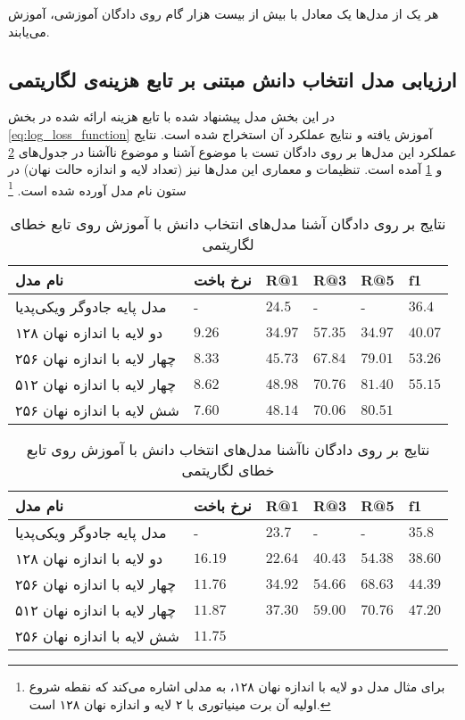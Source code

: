 هر یک از مدل‌ها یک 
معادل با بیش از بیست هزار گام روی دادگان آموزشی، آموزش می‌یابند.

\subsection{ارزیابی مدل انتخاب دانش مبتنی بر تابع هزینه‌ی لگاریتمی }
در این بخش مدل‌ پیشنهاد شده با تابع هزینه ارائه شده در بخش 
\ref{eq:log_loss_function}
آموزش یافته و نتایج عملکرد آن استخراج شده است. نتایج عملکرد این مدل‌ها بر روی دادگان تست با موضوع آشنا و موضوع ناآشنا در جدول‌های 
\ref{table:knowledge:log:unseen}
و 
\ref{table:knowledge:log:seen}
آمده است. تنظیمات و معماری این مدل‌ها نیز (تعداد لایه و اندازه حالت نهان) در ستون نام مدل آورده شده است.
\footnote{برای مثال مدل دو لایه با اندازه نهان ۱۲۸، به مدلی اشاره می‌کند که نقطه شروع اولیه آن برت مینیاتوری با ۲ لایه و اندازه نهان ۱۲۸ است.}

\begin{table}[h]
	\caption{نتایج بر روی دادگان آشنا مدل‌های انتخاب دانش با آموزش روی تابع خطای لگاریتمی }
	\centering
	\label{table:knowledge:log:seen}
	\begin{tabular}{|l|l|l|l|l|l|}
		\hline
		نام مدل                      & نرخ باخت & R@1     & R@3     & R@5     & f1      \\ \hline
		مدل پایه جادوگر ویکی‌پدیا    & -        & $24.5$  & -       & -       & $36.4$  \\ \hline
		دو لایه با اندازه نهان ۱۲۸   & $9.26$   & $34.97$ & $57.35$ & $34.97$ & $40.07$ \\ \hline
		چهار لایه با اندازه نهان ۲۵۶ & $8.33$   & $45.73$ & $67.84$ & $79.01$ & $53.26$ \\ \hline
		چهار لایه با اندازه نهان ۵۱۲ & $8.62$   & $48.98$ & $70.76$ & $81.40$ & $55.15$ \\ \hline
		شش لایه با اندازه نهان ۲۵۶   & $7.60$   & $48.14$ & $70.06$ & $80.51$ &         \\ \hline
	\end{tabular}
\end{table}

\begin{table}[h]
	\caption{نتایج بر روی دادگان ناآشنا مدل‌های انتخاب دانش با آموزش روی تابع خطای لگاریتمی }
	\centering
	\label{table:knowledge:log:unseen}
	\begin{tabular}{|l|l|l|l|l|l|}
		\hline
		نام مدل                      & نرخ باخت & R@1     & R@3     & R@5     & f1      \\ \hline
		مدل پایه جادوگر ویکی‌پدیا    & -        & $23.7$  & -       & -       & $35.8$  \\ \hline
		دو لایه با اندازه نهان ۱۲۸   & $16.19$  & $22.64$ & $40.43$ & $54.38$ & $38.60$ \\ \hline
		چهار لایه با اندازه نهان ۲۵۶ & $11.76$  & $34.92$ & $54.66$ & $68.63$ & $44.39$ \\ \hline
		چهار لایه با اندازه نهان ۵۱۲ & $11.87$  & $37.30$ & $59.00$ & $70.76$ & $47.20$ \\ \hline
		شش لایه با اندازه نهان ۲۵۶   & $11.75$  &         &         &         &         \\ \hline
	\end{tabular}
\end{table}


